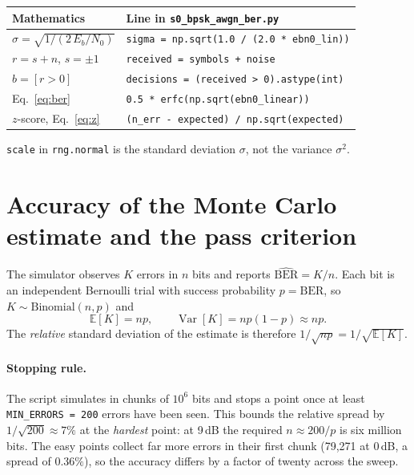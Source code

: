 \documentclass[11pt,a4paper]{article}
\newcommand{\EbNo}{E_b/N_0}
\begin{document}
\begin{center}
\begin{tabular}{@{}ll@{}}
\toprule
Mathematics & Line in \texttt{s0\_bpsk\_awgn\_ber.py} \\
\midrule
$\sigma = \sqrt{1/(2\,\EbNo)}$ & \texttt{sigma = np.sqrt(1.0 / (2.0 * ebn0\_lin))} \\
$r = s+n$, $s=\pm1$ & \texttt{received = symbols + noise} \\
$\hat b = [r>0]$ & \texttt{decisions = (received > 0).astype(int)} \\
Eq.~\eqref{eq:ber} & \texttt{0.5 * erfc(np.sqrt(ebn0\_linear))} \\
$z$-score, Eq.~\eqref{eq:z} & \texttt{(n\_err - expected) / np.sqrt(expected)} \\
\bottomrule
\end{tabular}
\end{center}

\texttt{scale} in \texttt{rng.normal} is the standard deviation
$\sigma$, not the variance $\sigma^2$.

\section{Accuracy of the Monte Carlo estimate and the pass criterion}

The simulator observes $K$ errors in $n$ bits and reports $\widehat{\mathrm{BER}} = K/n$.
Each bit is an independent Bernoulli trial with success probability $p=\mathrm{BER}$,
so $K\sim\mathrm{Binomial}(n,p)$ and
\[
  \mathbb E[K] = np, \qquad
  \operatorname{Var}[K] = np(1-p)\approx np .
\]
The \emph{relative} standard deviation of the estimate is therefore
$1/\sqrt{np} = 1/\sqrt{\mathbb E[K]}$.

\paragraph{Stopping rule.}
The script simulates in chunks of $10^6$ bits and stops a point once at least
\texttt{MIN\_ERRORS = 200} errors have been seen. This bounds the relative
spread by $1/\sqrt{200}\approx7\%$ at the \emph{hardest} point: at 9\,dB the
required $n\approx200/p$ is six million bits. The easy points collect far more
errors in their first chunk (79{,}271 at 0\,dB, a spread of $0.36\%$), so the
accuracy differs by a factor of twenty across the sweep.
\end{document}
